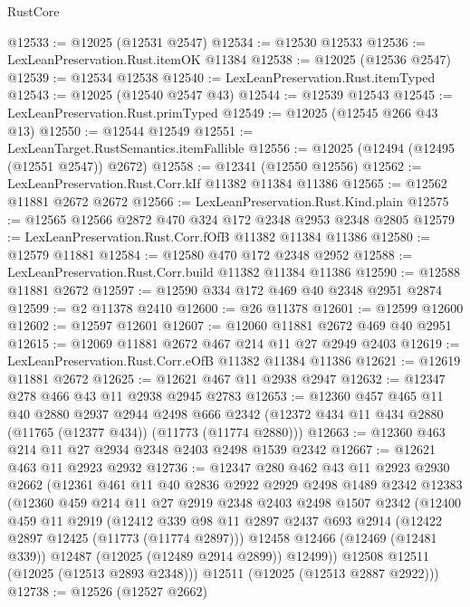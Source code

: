 \begin{lexlean}{RustCore}
\begin{coremodule}
@12533 := @12025 (@12531 @2547)
@12534 := @12530 @12533
@12536 := LexLeanPreservation.Rust.itemOK @11384
@12538 := @12025 (@12536 @2547)
@12539 := @12534 @12538
@12540 := LexLeanPreservation.Rust.itemTyped
@12543 := @12025 (@12540 @2547 @43)
@12544 := @12539 @12543
@12545 := LexLeanPreservation.Rust.primTyped
@12549 := @12025 (@12545 @266 @43 @13)
@12550 := @12544 @12549
@12551 := LexLeanTarget.RustSemantics.itemFallible
@12556 := @12025 (@12494 (@12495 (@12551 @2547)) @2672)
@12558 := @12341 (@12550 @12556)
@12562 := LexLeanPreservation.Rust.Corr.kIf @11382 @11384 @11386
@12565 := @12562 @11881 @2672 @2672
@12566 := LexLeanPreservation.Rust.Kind.plain
@12575 := @12565 @12566 @2872 @470 @324 @172 @2348 @2953 @2348 @2805
@12579 := LexLeanPreservation.Rust.Corr.fOfB @11382 @11384 @11386
@12580 := @12579 @11881
@12584 := @12580 @470 @172 @2348 @2952
@12588 := LexLeanPreservation.Rust.Corr.build @11382 @11384 @11386
@12590 := @12588 @11881 @2672
@12597 := @12590 @334 @172 @469 @40 @2348 @2951 @2874
@12599 := @2 @11378 @2410
@12600 := @26 @11378
@12601 := @12599 @12600
@12602 := @12597 @12601
@12607 := @12060 @11881 @2672 @469 @40 @2951
@12615 := @12069 @11881 @2672 @467 @214 @11 @27 @2949 @2403
@12619 := LexLeanPreservation.Rust.Corr.eOfB @11382 @11384 @11386
@12621 := @12619 @11881 @2672
@12625 := @12621 @467 @11 @2938 @2947
@12632 := @12347 @278 @466 @43 @11 @2938 @2945 @2783
@12653 := @12360
    @457
    @465
    @11
    @40
    @2880
    @2937
    @2944
    @2498
    @666
    @2342
    (@12372 @434 @11 @434 @2880 (@11765 (@12377 @434)) (@11773 (@11774 @2880)))
@12663 := @12360 @463 @214 @11 @27 @2934 @2348 @2403 @2498 @1539 @2342
@12667 := @12621 @463 @11 @2923 @2932
@12736 := @12347
    @280
    @462
    @43
    @11
    @2923
    @2930
    @2662
    (@12361
      @461
      @11
      @40
      @2836
      @2922
      @2929
      @2498
      @1489
      @2342
      @12383
      (@12360
        @459
        @214
        @11
        @27
        @2919
        @2348
        @2403
        @2498
        @1507
        @2342
        (@12400
          @459
          @11
          @2919
          (@12412
            @339
            @98
            @11
            @2897
            @2437
            @693
            @2914
            (@12422 @2897 @12425 (@11773 (@11774 @2897)))
            @12458
            @12466
            (@12469 (@12481 @339))
            @12487
            (@12025 (@12489 @2914 @2899))
            @12499))
        @12508
        @12511
        (@12025 (@12513 @2893 @2348)))
      @12511
      (@12025 (@12513 @2887 @2922)))
@12738 := @12526 (@12527 @2662)

\end{coremodule}
\end{lexlean}
